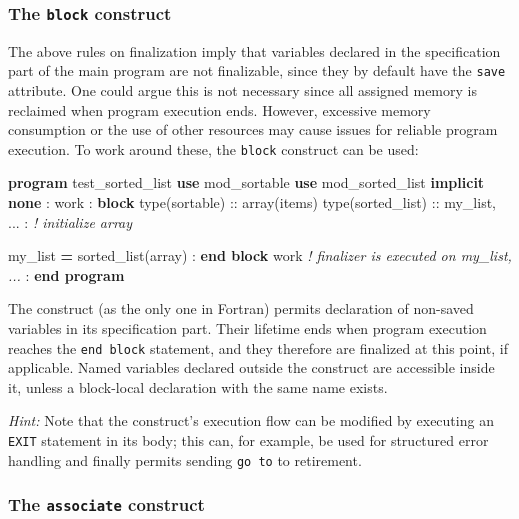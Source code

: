 \documentclass[
  paper=a4,
  ,captions=tableheading
]{scrartcl}
\newenvironment{Shaded}{\begin{snugshade}}{\end{snugshade}}
\newcommand{\CommentTok}[1]{\textcolor[rgb]{0.56,0.35,0.01}{\textit{#1}}}
\newcommand{\DataTypeTok}[1]{\textcolor[rgb]{0.13,0.29,0.53}{#1}}
\newcommand{\KeywordTok}[1]{\textcolor[rgb]{0.13,0.29,0.53}{\textbf{#1}}}
\newcommand{\NormalTok}[1]{#1}
\begin{document}
\subsubsection{\texorpdfstring{The \texttt{block}
construct}{The block construct}}\label{the-block-construct}

The above rules on finalization imply that variables declared in the
specification part of the main program are not finalizable, since they
by default have the \texttt{save} attribute. One could argue this is not
necessary since all assigned memory is reclaimed when program execution
ends. However, excessive memory consumption or the use of other
resources may cause issues for reliable program execution. To work
around these, the \texttt{block} construct can be used:

\begin{Shaded}
\begin{Highlighting}[]
\KeywordTok{program}\NormalTok{ test\_sorted\_list}
  \KeywordTok{use}\NormalTok{ mod\_sortable}
  \KeywordTok{use}\NormalTok{ mod\_sorted\_list}
  \KeywordTok{implicit} \KeywordTok{none}
\NormalTok{  :}
\NormalTok{  work : }\KeywordTok{block}
    \DataTypeTok{type(sortable)} \DataTypeTok{::}\NormalTok{ array(items)}
    \DataTypeTok{type(sorted\_list)} \DataTypeTok{::}\NormalTok{ my\_list, ...}
\NormalTok{    : }\CommentTok{! initialize array}

\NormalTok{    my\_list }\KeywordTok{=}\NormalTok{ sorted\_list(array)}
\NormalTok{    :}
  \KeywordTok{end block}\NormalTok{ work  }\CommentTok{! finalizer is executed on my\_list, ...}
\NormalTok{  :}
\KeywordTok{end program}
\end{Highlighting}
\end{Shaded}

The construct (as the only one in Fortran) permits declaration of
non-saved variables in its specification part. Their lifetime ends when
program execution reaches the \texttt{end\ block} statement, and they
therefore are finalized at this point, if applicable. Named variables
declared outside the construct are accessible inside it, unless a
block-local declaration with the same name exists.

\emph{Hint:} Note that the construct's execution flow can be modified by
executing an \texttt{EXIT} statement in its body; this can, for example,
be used for structured error handling and finally permits sending
\texttt{go\ to} to retirement.

\subsubsection{\texorpdfstring{The \texttt{associate}
construct}{The associate construct}}\label{the-associate-construct}
\end{document}
